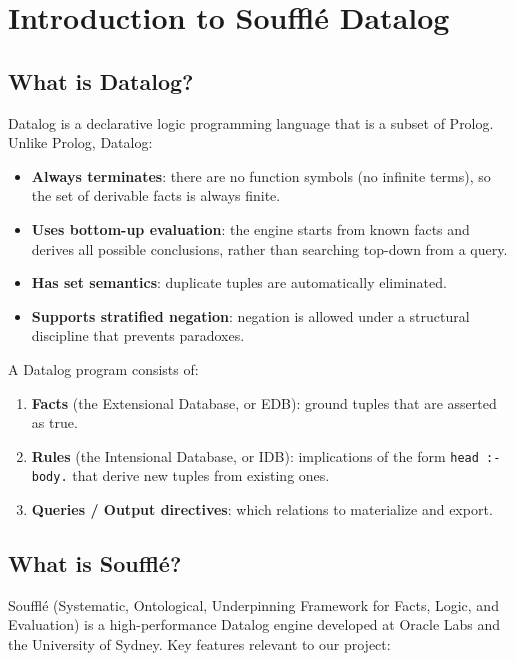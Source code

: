 \documentclass[11pt,letterpaper]{article}
\begin{document}
\tableofcontents
\newpage

\section{Introduction to Souffl\'{e} Datalog}
\label{sec:intro-souffle}

\subsection{What is Datalog?}

Datalog is a declarative logic programming language that is a subset of Prolog. Unlike Prolog, Datalog:
\begin{itemize}
  \item \textbf{Always terminates}: there are no function symbols (no infinite terms), so the set of derivable facts is always finite.
  \item \textbf{Uses bottom-up evaluation}: the engine starts from known facts and derives all possible conclusions, rather than searching top-down from a query.
  \item \textbf{Has set semantics}: duplicate tuples are automatically eliminated.
  \item \textbf{Supports stratified negation}: negation is allowed under a structural discipline that prevents paradoxes.
\end{itemize}

A Datalog program consists of:
\begin{enumerate}
  \item \textbf{Facts} (the Extensional Database, or EDB): ground tuples that are asserted as true.
  \item \textbf{Rules} (the Intensional Database, or IDB): implications of the form \texttt{head :- body.} that derive new tuples from existing ones.
  \item \textbf{Queries / Output directives}: which relations to materialize and export.
\end{enumerate}

\subsection{What is Souffl\'{e}?}

Souffl\'{e} (Systematic, Ontological, Underpinning Framework for Facts, Logic, and Evaluation) is a high-performance Datalog engine developed at Oracle Labs and the University of Sydney. Key features relevant to our project:
\end{document}
